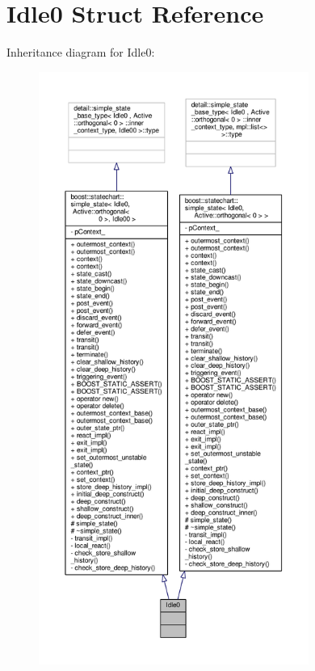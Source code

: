 \hypertarget{struct_idle0}{}\section{Idle0 Struct Reference}
\label{struct_idle0}


Inheritance diagram for Idle0\+:
\nopagebreak
\begin{figure}[H]
\begin{center}
\leavevmode
\includegraphics[height=550pt]{struct_idle0__inherit__graph}
\end{center}
\end{figure}


